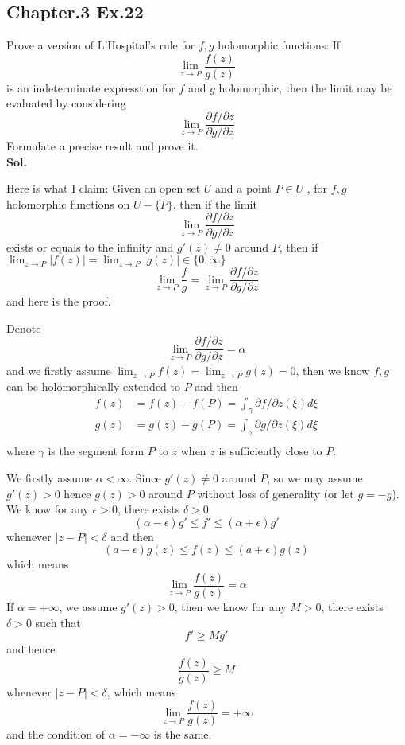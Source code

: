 \documentclass[lang=en,11pt,a4paper,citestyle =authoryear]{elegantpaper}
\begin{document}
\subsection*{Chapter.3 Ex.22} 
Prove a version of L'Hospital's rule for $f,g$ holomorphic functions: If
\[
\lim_{z\to P}\dfrac{f(z)}{g(z)}
\] is an indeterminate expresstion for $f$ and $g$ holomorphic, then the limit may be evaluated by considering
\[
\lim_{z\to P}\dfrac{\partial f/\partial z}{\partial g/\partial z}
\] 
Formulate a precise result and prove it.
\vspace{0.5em}\\
\textbf{Sol.} \par
Here is what I claim:  Given an open set $U$ and a point $P\in U$ , for $f,g$ holomorphic functions on $U-\{P\}$, then if the limit 
\[\lim_{z\to P} \dfrac{\partial f/\partial z}{\partial g/\partial z}\]
exists or equals to the infinity and $g'(z) \neq 0$ around $P$, then if $\lim_{z\to P} |f(z)| = \lim_{z\to P} |g(z)| \in \{0,\infty\}$
\[
\lim_{z\to P}\dfrac{f}{g} = \lim_{z\to P} \dfrac{\partial f/\partial z}{\partial g/\partial z} 
\]
and here is the proof.\par
Denote
\[\lim_{z\to P} \dfrac{\partial f/\partial z}{\partial g/\partial z} = \alpha\]
and we firstly assume $\lim_{z\to P} f(z) = \lim_{z\to P} g(z) = 0$, then we know $f,g$ can be holomorphically extended to $P$ and then 
\[
\begin{aligned}
f(z) &= f(z)-f(P) = \int_{\gamma} \partial f/\partial z (\xi) d\xi \\
g(z) &= g(z)-g(P) = \int_{\gamma} \partial g/\partial z (\xi) d\xi \\
\end{aligned}
\]
where $\gamma$ is the segment form $P$ to $z$ when $z$ is sufficiently close to $P$.\par 
We firstly assume $\alpha < \infty$. Since $g'(z)\neq 0$ around $P$, so we may assume $g'(z)>0$ hence $g(z) > 0$ around $P$ without loss of generality (or let $g = -g$). We know for any $\epsilon > 0$, there exists $\delta > 0$
\[
(\alpha-\epsilon)g' \leq f' \leq (\alpha+\epsilon)g'
\]
whenever $|z-P| < \delta$ and then 
\[(a-\epsilon)g(z) \leq f(z) \leq (a+\epsilon)g(z)\]
which means
\[
\lim_{z\to P} \dfrac{f(z)}{g(z)} = \alpha
\]
If $\alpha = +\infty$, we assume $g'(z) > 0$, then we know for any $M>0$, there exists $\delta > 0$ such that \[f' \geq Mg'\]
and hence
\[
\dfrac{f(z)}{g(z)} \geq M
\]
whenever $|z-P|<\delta$, which means 
\[
\lim_{z\to P} \dfrac{f(z)}{g(z)} = +\infty
\]
and the condition of  $\alpha = -\infty$ is the same.\par
\end{document}
